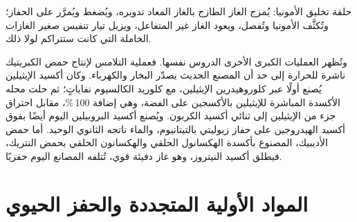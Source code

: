 \begin{omfigure}

{\small حلقة تخليق الأمونيا: يُمزج الغاز الطازج بالغاز المعاد تدويره،
ويُضغط ويُمرَّر على الحفاز؛ وتُكثَّف الأمونيا وتُفصل، ويعود الغاز
غير المتفاعل، ويزيل تيار تنفيس صغير الغازات الخاملة التي كانت
ستتراكم لولا ذلك.}
\end{omfigure}

وتُظهر العمليات الكبرى الأخرى الدروس نفسها. فعملية التلامس لإنتاج حمض
الكبريتيك ناشرة للحرارة إلى حد أن المصنع الحديث يصدّر البخار والكهرباء.
وكان أكسيد الإيثيلين يُصنع أولًا عبر كلوروهيدرين الإيثيلين، مع كلوريد
الكالسيوم نفاياتٍ؛ ثم حلت محله الأكسدة المباشرة للإيثيلين بالأكسجين على الفضة، وهي
إضافة  100\,\%، مقابل احتراق جزء من الإيثيلين إلى
ثنائي أكسيد الكربون. ويُصنع أكسيد البروبيلين اليوم أيضًا بفوق أكسيد الهيدروجين على
حفاز زيوليتي بالتيتانيوم، والماء ناتجه الثانوي الوحيد. أما حمض الأديبيك،
المصنوع بأكسدة الهكسانول الحلقي والهكسانون الحلقي بحمض النتريك، فيطلق
أكسيد النيتروز، وهو غاز دفيئة قوي، تُتلفه المصانع اليوم حفزيًا.

\section{المواد الأولية المتجددة والحفز الحيوي}

